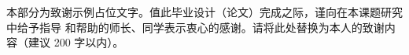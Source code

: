 \begin{acknowledgement}
本部分为致谢示例占位文字。值此毕业设计（论文）完成之际，谨向在本课题研究中给予指导
和帮助的师长、同学表示衷心的感谢。请将此处替换为本人的致谢内容（建议 200 字以内）。
\end{acknowledgement}
